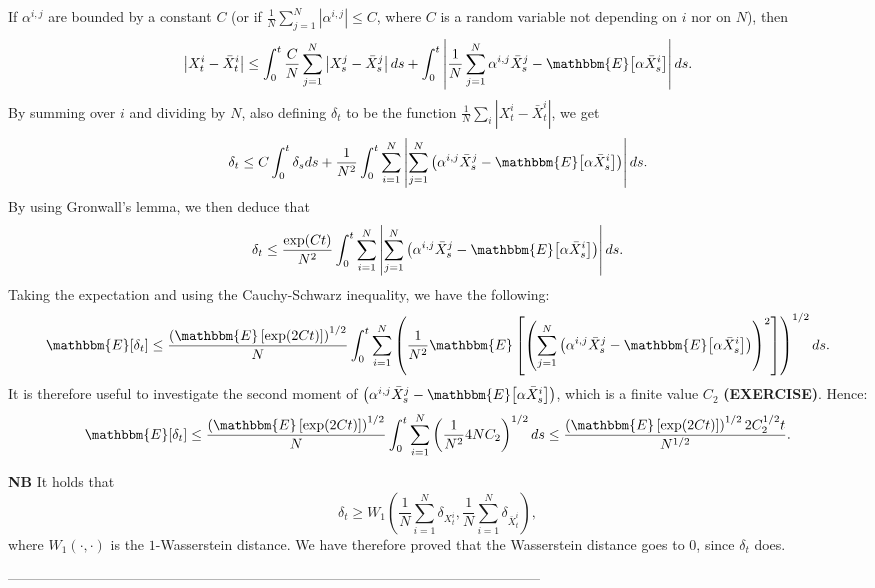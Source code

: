 If $\alpha^{i, j}$ are bounded by a constant $C$ (or if $\frac{1}{N} \sum_{j = 1}^N | \alpha^{i,j} | \leq C$, where $C$ is a random variable not depending on $i$ nor on $N$), then \[ \left| X^i_t - \bar{X}^i_t \right| \leq \int_0^t \frac{C}{N} \sum_{j = 1}^N \left| X^j_s - \bar{X}^j_s \right| ds + \int_0^t \left| \frac{1}{N} \sum_{j = 1}^N \alpha^{i, j} \bar{X}^j_s - \mathbbm{E} \big[ \alpha \bar{X}^i_s \big] \right| ds. \] By summing over $i$ and dividing by $N$, also defining $\delta_t$ to be the function $\frac{1}{N} \sum_i \left| X^i_t - \bar{X}^i_t \right|$, we get \[ \delta_t \leq C \int_0^t \delta_s ds + \frac{1}{N^2} \int_0^t \sum_{i = 1}^N \left| \sum_{j = 1}^N \left( \alpha^{i, j} \bar{X}^j_s - \mathbbm{E} \big[ \alpha \bar{X}^i_s \big] \right) \right| ds. \]
By using Gronwall's lemma, we then deduce that \[ \delta_t \leq \frac{\exp(C t)}{N^2} \int_0^t \sum_{i = 1}^N \left| \sum_{j = 1}^N \left( \alpha^{i, j} \bar{X}^j_s - \mathbbm{E} \big[ \alpha \bar{X}^i_s \big] \right) \right| ds. \]
Taking the expectation and using the Cauchy-Schwarz inequality, we have the following: \[ \mathbbm{E} [\delta_t] \leq \frac{ \left( \mathbbm{E} \left[ \exp(2 C t) \right] \right)^{1/2}}{N} \int_0^t \sum_{i = 1}^N \left( \frac{1}{N^2} \mathbbm{E} \left[ \left( \sum_{j = 1}^N \left( \alpha^{i, j} \bar{X}^j_s - \mathbbm{E} \big[ \alpha \bar{X}^i_s \big] \right) \right)^2 \right] \right)^{1/2} ds. \]
It is therefore useful to investigate the second moment of $\left( \alpha^{i, j} \bar{X}^j_s - \mathbbm{E} \big[ \alpha \bar{X}^i_s \big] \right)$, which is a finite value $C_2$  \textbf{(EXERCISE)}. Hence: \[ \mathbbm{E} [ \delta_t ] \leq \frac{ \left( \mathbbm{E} \left[ \exp(2 C t) \right] \right)^{1/2}}{N} \int_0^t \sum_{i = 1}^N \left( \frac{1}{N^2} 4 N C_2 \right)^{1/2} ds \leq \frac{\left( \mathbbm{E} \left[ \exp(2 C t) \right] \right)^{1/2} 2 C_2^{1/2} t}{N^{1/2}} . \]

\textbf{NB} It holds that \[ \delta_t \geq W_1 \left( \frac{1}{N} \sum_{i = 1}^N \delta_{X^i_t}, \frac{1}{N} \sum_{i = 1}^N \delta_{\bar{X}^i_t} \right), \] where $W_1(\cdot, \cdot)$ is the $1$-Wasserstein distance. We have therefore proved that the Wasserstein distance goes to $0$, since $\delta_t$ does. \\

\begin{center}
------------------------------------------------------------------------------------------------------------------ \\
\end{center}


